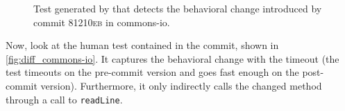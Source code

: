 \begin{figure}[h]
\centering
{}
\caption{Test generated by \DCII that detects the behavioral change introduced by commit \textsc{81210eb} in commons-io.}
\label{fig:ampl_commons-io}
\end{figure}

Now, look at the human test contained in the commit, shown in \autoref{fig:diff_commons-io}.
It captures the behavioral change with the timeout (the test timeouts on the pre-commit version and goes fast enough on the post-commit version). 
Furthermore, it only indirectly calls the changed method through a call to \texttt{readLine}.

